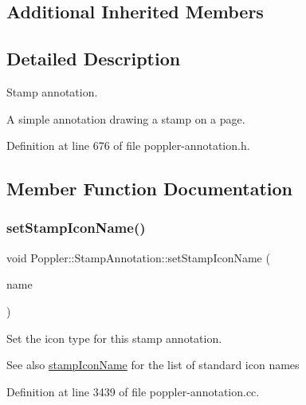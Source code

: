 \subsection*{Additional Inherited Members}


\subsection{Detailed Description}
Stamp annotation. 

A simple annotation drawing a stamp on a page. 

Definition at line 676 of file poppler-\/annotation.\+h.



\subsection{Member Function Documentation}
\mbox{\label{class_poppler_1_1_stamp_annotation_adb78400f376919308721d34e396e82dc}} 
\subsubsection{\texorpdfstring{set\+Stamp\+Icon\+Name()}{setStampIconName()}}
{\footnotesize\ttfamily void Poppler\+::\+Stamp\+Annotation\+::set\+Stamp\+Icon\+Name (\begin{DoxyParamCaption}\item[{const Q\+String \&}]{name }\end{DoxyParamCaption})}

Set the icon type for this stamp annotation.

\begin{DoxySeeAlso}{See also}
\hyperlink{class_poppler_1_1_stamp_annotation_aeacae1f94260e47ff079e2c8a8dd636e}{stamp\+Icon\+Name} for the list of standard icon names 
\end{DoxySeeAlso}


Definition at line 3439 of file poppler-\/annotation.\+cc.

\mbox{\label{class_poppler_1_1_stamp_annotation_aeacae1f94260e47ff079e2c8a8dd636e}} 
